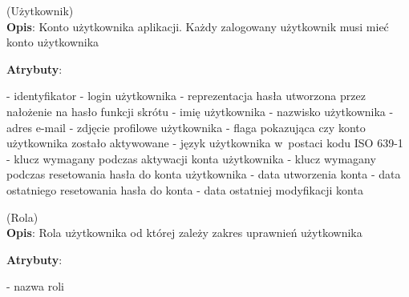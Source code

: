 \begin{enumerate}[label={\textbf{KAT/1/\protect\twodigits{\theenumi}}}, wide, labelwidth=!, labelindent=0pt, labelsep=0pt, series=reqs]
    \setlength\itemsep{1.75em}
    \label{kat:User} (Użytkownik)\\
    \indent\textbf{Opis}: Konto użytkownika aplikacji. Każdy zalogowany użytkownik musi mieć konto użytkownika
    \par
    \textbf{Atrybuty}:
    \begin{itemize}[series=atr, wide, align=left, leftmargin=190pt]
        \label{kat:User:id}- identyfikator
        \label{kat:User:login}- login użytkownika
        \label{kat:User:passwordHash}- reprezentacja hasła utworzona przez nałożenie na hasło funkcji skrótu
        \label{kat:User:firstName}- imię użytkownika
        \label{kat:User:lastName}- nazwisko użytkownika
        \label{kat:User:email}- adres e-mail
        \label{kat:User:image}- zdjęcie profilowe użytkownika
        \label{kat:User:activated}- flaga pokazująca czy konto użytkownika zostało aktywowane
        \label{kat:User:language}- język użytkownika w~postaci kodu ISO 639-1
        \label{kat:User:activationKey}- klucz wymagany podczas aktywacji konta użytkownika
        \label{kat:User:resetKey}- klucz wymagany podczas resetowania hasła do konta użytkownika
        \label{kat:User:createdDate}- data utworzenia konta
        \label{kat:User:resetDate}- data ostatniego resetowania hasła do konta
        \label{kat:User:lastModifiedDate}- data ostatniej modyfikacji konta
    \end{itemize}

    \label{kat:Authority} (Rola)\\
    \indent\textbf{Opis}: Rola użytkownika od której zależy zakres uprawnień użytkownika
    \par
    \textbf{Atrybuty}:
    \begin{itemize}[series=atr, wide, align=left, leftmargin=190pt]
        \label{kat:Authority:name}- nazwa roli
    \end{itemize}


\end{enumerate}

